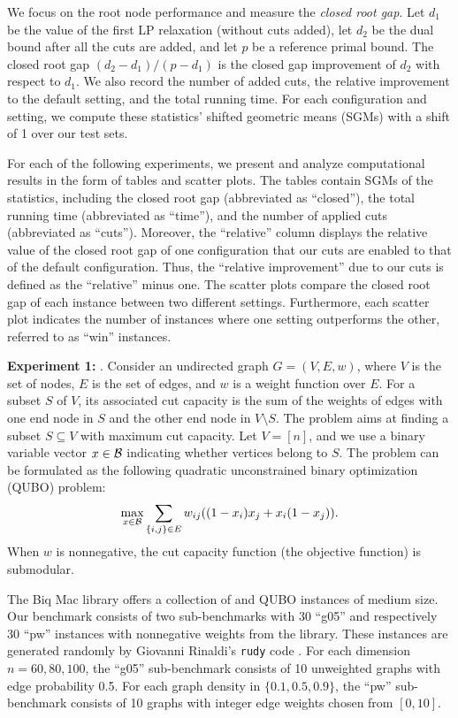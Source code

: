  We focus on  the root node performance and measure the \textit{closed root gap}. Let $d_1$ be the value of the first LP relaxation (without cuts added), let $d_2$ be the dual
bound  after all the cuts are added, and  let $p$ be a reference primal bound. The closed root gap $(d_2-d_1) /(p-d_1)$
 is the closed gap improvement of $d_2$ with
respect to $d_1$.  We also record the number of added cuts, the relative improvement to the default setting, and the total running time. For each configuration and setting,  we compute these statistics' shifted geometric means (SGMs) with a shift of 1 over our test sets.

For each of the following experiments, we present and analyze computational results in the form of tables and scatter plots. The tables contain SGMs of the statistics, including the closed root gap (abbreviated as ``closed''), the total running time (abbreviated as ``time''), and the number of applied cuts  (abbreviated as ``cuts'').  Moreover, the ``relative'' column  displays the relative value of the closed root gap of one configuration that our cuts are enabled   to that of the default configuration. Thus, the ``relative improvement'' due to our cuts is defined as the ``relative'' minus one. The scatter plots compare the closed root gap of each instance between two different settings. Furthermore, each scatter plot indicates the number of instances where one setting outperforms the other, referred to as ``win'' instances.

\bigskip

\noindent\textbf{Experiment 1:} \maxcut. Consider an undirected graph $G=(V,E,w)$, where $V$ is the set of nodes, $E$ is the set of edges, and $w$ is a weight function over $E$. For a subset $S$ of $V$, its associated cut capacity  is  the sum of the weights of edges with one end node in $S$ and the other end node  in $V \setminus S$. The \maxcut problem aims at finding a subset $S \subseteq V$ with  maximum cut capacity. Let $V = [n]$, and we use a  binary variable vector $x \in \mathcal B$ indicating whether vertices belong to $S$.  The problem can be formulated as the following   quadratic unconstrained binary optimization (QUBO) problem: $$
    \max_{x \in \mathcal B}  \sum_{\{i, j\} \in E}w_{ij} ((1-x_i)x_j + x_i(1-x_j)).$$
 When $w$ is nonnegative, the cut capacity function (the objective function) is  submodular. 

The Biq Mac library  \cite{wiegele2007biq} offers a collection of  \maxcut and QUBO instances of medium size.
 Our benchmark consists of two sub-benchmarks with 30 ``g05'' and respectively 30 ``pw'' \maxcut instances with nonnegative weights from the library. These instances are generated randomly by Giovanni Rinaldi's \texttt{rudy} code \cite{rendl2010solving,rinaldi1998rudy}.  For each dimension $n=60,80,100$, the ``g05'' sub-benchmark consists of 10 unweighted graphs with edge probability 0.5. For each graph density in $\{0.1,0.5,0.9\}$,   the ``pw'' sub-benchmark consists of 10 graphs with integer edge weights chosen from $[0,10]$. 
 
